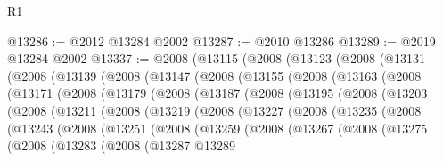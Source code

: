\begin{lexlean}{R1}
\begin{coremodule}
@13286 := @2012 @13284 @2002
@13287 := @2010 @13286
@13289 := @2019 @13284 @2002
@13337 := @2008
    (@13115
      (@2008
        (@13123
          (@2008
            (@13131
              (@2008
                (@13139
                  (@2008
                    (@13147
                      (@2008
                        (@13155
                          (@2008
                            (@13163
                              (@2008
                                (@13171
                                  (@2008
                                    (@13179
                                      (@2008
                                        (@13187
                                          (@2008
                                            (@13195
                                              (@2008
                                                (@13203
                                                  (@2008
                                                    (@13211
                                                      (@2008
                                                        (@13219
                                                          (@2008
                                                            (@13227
                                                              (@2008
                                                                (@13235
                                                                  (@2008
                                                                    (@13243
                                                                      (@2008
                                                                        (@13251
                                                                          (@2008
                                                                            (@13259
                                                                              (@2008
                                                                                (@13267
                                                                                  (@2008
                                                                                    (@13275
                                                                                      (@2008
                                                                                        (@13283
                                                                                          (@2008
                                                                                            (@13287
                                                                                              @13289

\end{coremodule}
\end{lexlean}
